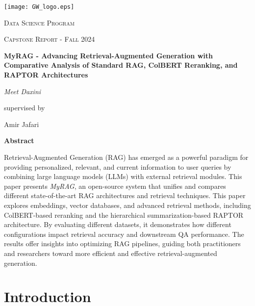 \documentclass{scrartcl}
\renewenvironment{abstract}{
    \centering
    \textbf{Abstract}
    \vspace{0.5cm}
    \par\itshape
    \begin{minipage}{0.7\linewidth}}{\end{minipage}
    \noindent\ignorespaces
}
\begin{document}
\begin{titlepage}
	\centering
	\texttt{[image: GW\_logo.eps]}\par
	\vspace{2cm}
	{\scshape\LARGE Data Science Program \par}
	\vspace{1cm}
	{\scshape\Large Capstone Report - Fall 2024\par}
	\vspace{1.5cm}
	{\huge\bfseries MyRAG - Advancing Retrieval-Augmented Generation with Comparative Analysis of Standard RAG, ColBERT Reranking, and RAPTOR Architectures \par}
	\vspace{2cm}
	{\Large\itshape Meet Daxini \\}\par
	\vspace{1.5cm}
	supervised by\par
	Amir Jafari
\newpage

	\vfill
	\begin{abstract}
Retrieval-Augmented Generation (RAG) has emerged as a powerful paradigm for providing personalized, relevant, and current information to user queries by combining large language models (LLMs) with external retrieval modules. This paper presents \textit{MyRAG}, an open-source system that unifies and compares different state-of-the-art RAG architectures and retrieval techniques. This paper explores embeddings, vector databases, and advanced retrieval methods, including ColBERT-based reranking and the hierarchical summarization-based RAPTOR architecture. By evaluating different datasets, it demonstrates how different configurations impact retrieval accuracy and downstream QA performance. The results offer insights into optimizing RAG pipelines, guiding both practitioners and researchers toward more efficient and effective retrieval-augmented generation.
	\end{abstract}
	\vfill
\end{titlepage}
\tableofcontents
\newpage
\section{Introduction}
\end{document}
